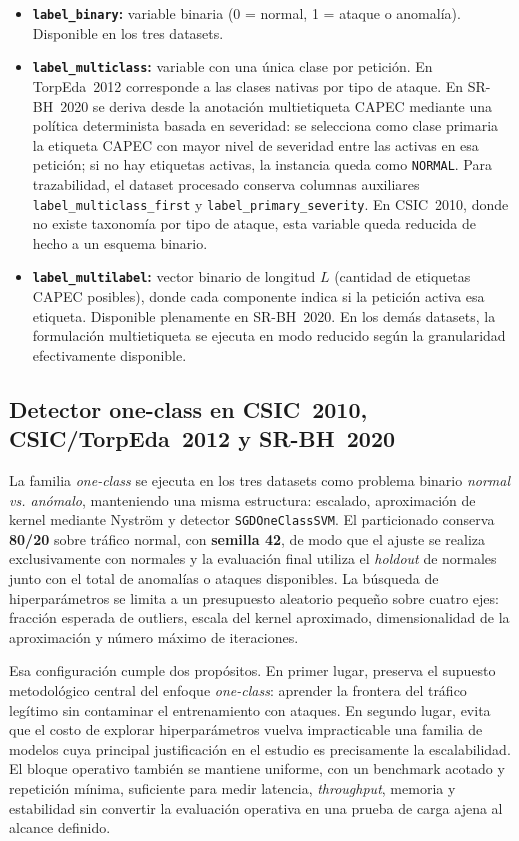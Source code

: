 \documentclass[12pt,oneside]{report}
\begin{document}
\begin{itemize}[leftmargin=*]
  \item \textbf{\texttt{label\_binary}:} variable binaria (0 = normal, 1 = ataque o anomalía). Disponible en los tres datasets.
  \item \textbf{\texttt{label\_multiclass}:} variable con una única clase por petición. En TorpEda~2012 corresponde a las clases nativas por tipo de ataque. En SR-BH~2020 se deriva desde la anotación multietiqueta CAPEC mediante una política determinista basada en severidad: se selecciona como clase primaria la etiqueta CAPEC con mayor nivel de severidad entre las activas en esa petición; si no hay etiquetas activas, la instancia queda como \texttt{NORMAL}. Para trazabilidad, el dataset procesado conserva columnas auxiliares \texttt{label\_multiclass\_first} y \texttt{label\_primary\_severity}. En CSIC~2010, donde no existe taxonomía por tipo de ataque, esta variable queda reducida de hecho a un esquema binario.
  \item \textbf{\texttt{label\_multilabel}:} vector binario de longitud $L$ (cantidad de etiquetas CAPEC posibles), donde cada componente indica si la petición activa esa etiqueta. Disponible plenamente en SR-BH~2020. En los demás datasets, la formulación multietiqueta se ejecuta en modo reducido según la granularidad efectivamente disponible.
\end{itemize}

\subsection{Detector one-class en CSIC~2010, CSIC/TorpEda~2012 y SR-BH~2020}
La familia \textit{one-class} se ejecuta en los tres datasets como problema binario \textit{normal vs. anómalo}, manteniendo una misma estructura: escalado, aproximación de kernel mediante Nyström y detector \texttt{SGDOneClassSVM}. El particionado conserva \textbf{80/20} sobre tráfico normal, con \textbf{semilla 42}, de modo que el ajuste se realiza exclusivamente con normales y la evaluación final utiliza el \textit{holdout} de normales junto con el total de anomalías o ataques disponibles. La búsqueda de hiperparámetros se limita a un presupuesto aleatorio pequeño sobre cuatro ejes: fracción esperada de outliers, escala del kernel aproximado, dimensionalidad de la aproximación y número máximo de iteraciones.

Esa configuración cumple dos propósitos. En primer lugar, preserva el supuesto metodológico central del enfoque \textit{one-class}: aprender la frontera del tráfico legítimo sin contaminar el entrenamiento con ataques. En segundo lugar, evita que el costo de explorar hiperparámetros vuelva impracticable una familia de modelos cuya principal justificación en el estudio es precisamente la escalabilidad. El bloque operativo también se mantiene uniforme, con un benchmark acotado y repetición mínima, suficiente para medir latencia, \textit{throughput}, memoria y estabilidad sin convertir la evaluación operativa en una prueba de carga ajena al alcance definido.
\end{document}
